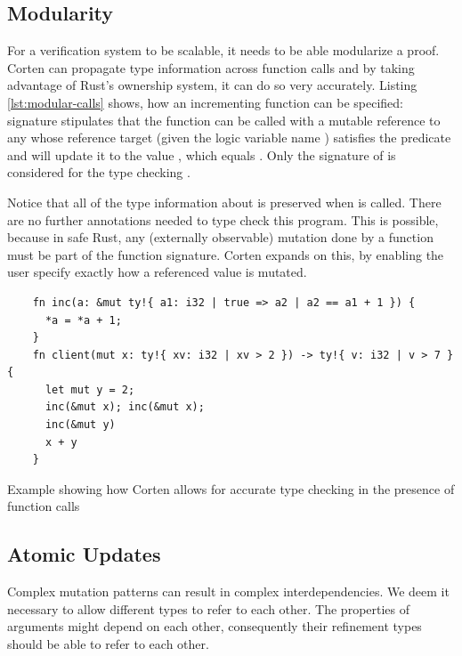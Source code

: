 \documentclass[twoside, english]{sdqthesis}
\theoremstyle{definition}
\begin{document}


\label{sec:modularity}\subsection{Modularity}

For a verification system to be scalable, it needs to be able modularize a proof. Corten can propagate type information across function calls and by taking advantage of Rust's ownership system, it can do so very accurately. Listing \ref{lst:modular-calls} shows, how an incrementing function  can be specified:  signature stipulates that the function can be called with a mutable reference to any  whose reference target (given the logic variable name ) satisfies the predicate  and will update it to the value , which equals . Only the signature of  is considered for the type checking . 

Notice that all of the type information about  is preserved when  is called. There are no further annotations needed to type check this program. This is possible, because in safe Rust, any (externally observable) mutation done by a function must be part of the function signature. Corten expands on this, by enabling the user specify exactly how a referenced value is mutated.

\begin{listing}[ht]
  \begin{verbatim}
    fn inc(a: &mut ty!{ a1: i32 | true => a2 | a2 == a1 + 1 }) {
      *a = *a + 1;
    }
    fn client(mut x: ty!{ xv: i32 | xv > 2 }) -> ty!{ v: i32 | v > 7 } {
      let mut y = 2;
      inc(&mut x); inc(&mut x);
      inc(&mut y)
      x + y
    }
  \end{verbatim}
  \caption{Example showing how Corten allows for accurate type checking in the presence of function calls }
  \label{lst:modular-calls}
\end{listing}


\subsection{Atomic Updates}\label{subsec:atomic-updates}

Complex mutation patterns can result in complex interdependencies. We deem it necessary to allow different types to refer to each other. 
The properties of arguments might depend on each other, consequently their refinement types should be able to refer to each other.
\end{document}
